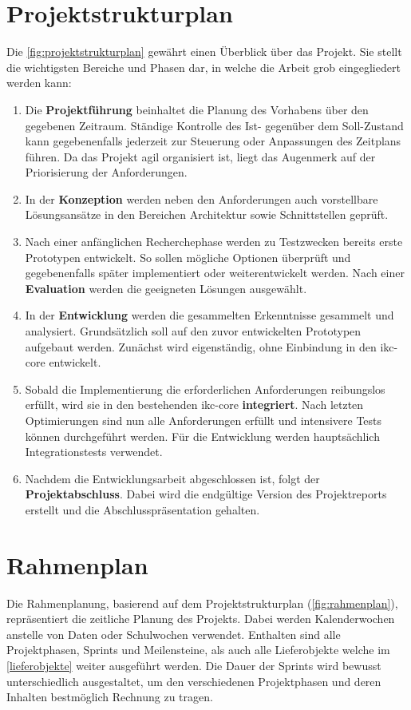 \section{Projektstrukturplan}
Die \autoref{fig:projektstrukturplan} gewährt einen Überblick über das Projekt. Sie stellt die wichtigsten Bereiche und Phasen dar, in welche die Arbeit grob eingegliedert werden kann:
\begin{enumerate}
    \item Die \textbf{Projektführung} beinhaltet die Planung des Vorhabens über den gegebenen Zeitraum. Ständige Kontrolle des Ist- gegenüber dem Soll-Zustand kann gegebenenfalls jederzeit zur Steuerung oder Anpassungen des Zeitplans führen. Da das Projekt agil organisiert ist, liegt das Augenmerk auf der Priorisierung der Anforderungen.
    \item In der \textbf{Konzeption} werden neben den Anforderungen auch vorstellbare Lös\-ungs\-an\-sätz\-e in den Bereichen Architektur sowie Schnittstellen geprüft.
    \item Nach einer anfänglichen Recherchephase werden zu Testzwecken bereits erste Prototypen entwickelt. So sollen mögliche Optionen überprüft und gegebenenfalls später implementiert oder weiterentwickelt werden. Nach einer \textbf{Evaluation} werden die geeigneten Lösungen ausgewählt.
    \item In der \textbf{Entwicklung} werden die gesammelten Erkenntnisse gesammelt und analysiert. Grundsätzlich soll auf den zuvor entwickelten Prototypen aufgebaut werden. Zunächst wird ei\-gen\-stän\-dig, ohne Einbindung in den \gls{ikc-core} entwickelt.
    \item Sobald die Implementierung die erforderlichen Anforderungen reibungslos erfüllt, wird sie in den bestehenden \gls{ikc-core} \textbf{integriert}. Nach letzten Optimierungen sind nun alle Anforderungen erfüllt und intensivere Tests können durchgeführt werden. Für die Entwicklung werden hauptsächlich Integrationstests verwendet.
    \item Nachdem die Entwicklungsarbeit abgeschlossen ist, folgt der \textbf{Projektabschluss}. Dabei wird die endgültige Version des Projektreports erstellt und die Abschlusspräsentation gehalten.
\end{enumerate}

\section{Rahmenplan}
Die Rahmenplanung, basierend auf dem Projektstrukturplan (\autoref{fig:rahmenplan}), repräsentiert die zeitliche Planung des Projekts. Dabei werden Kalenderwochen anstelle von Daten oder Schulwochen verwendet. Enthalten sind alle Projektphasen, Sprints und Meilensteine, als auch alle Lieferobjekte welche im \autoref{lieferobjekte} weiter ausgeführt werden. Die Dauer der Sprints wird bewusst unterschiedlich ausgestaltet, um den verschiedenen Projektphasen und deren Inhalten bestmöglich Rechnung zu tragen.

